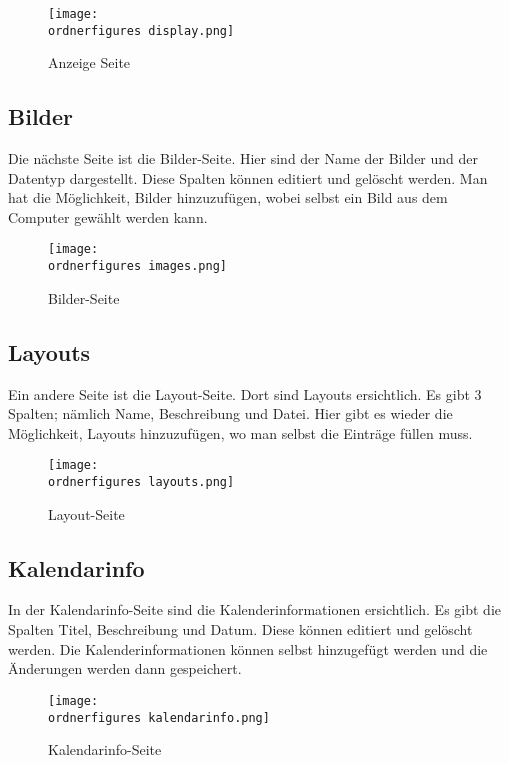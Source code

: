 \begin{figure}[H]
	\centering
	\texttt{[image: \\ordnerfigures display.png]}
	\caption{Anzeige Seite}
	\label{fi:anzeige}
\end{figure}


\subsection{Bilder}

Die nächste Seite ist die Bilder-Seite. Hier sind der Name der Bilder und der Datentyp dargestellt. Diese Spalten können editiert und gelöscht werden. Man hat die Möglichkeit, Bilder hinzuzufügen, wobei selbst ein Bild aus dem Computer gewählt werden kann.

\begin{figure}[H]
	\centering
	\texttt{[image: \\ordnerfigures images.png]}
	\caption{Bilder-Seite}
	\label{fi:images}
\end{figure}


\subsection{Layouts}
Ein andere Seite ist die Layout-Seite. Dort sind Layouts ersichtlich. Es gibt 3 Spalten; nämlich Name, Beschreibung und Datei. Hier gibt es wieder die Möglichkeit, Layouts hinzuzufügen, wo man selbst die Einträge füllen muss.

\begin{figure}[H]
	\centering
	\texttt{[image: \\ordnerfigures layouts.png]}
	\caption{Layout-Seite}
	\label{fi:layouts}
\end{figure}

\subsection{Kalendarinfo}

In der Kalendarinfo-Seite sind die Kalenderinformationen ersichtlich. Es gibt die Spalten Titel, Beschreibung und Datum. Diese können editiert und gelöscht werden. Die Kalenderinformationen können selbst hinzugefügt werden und die Änderungen werden dann gespeichert.

\begin{figure}[H]
	\centering
	\texttt{[image: \\ordnerfigures kalendarinfo.png]}
	\caption{Kalendarinfo-Seite}
	\label{fi:kalendar}
\end{figure}

